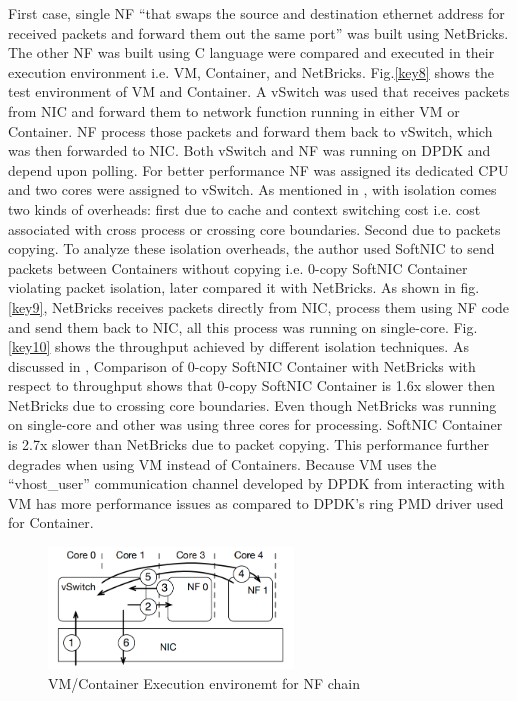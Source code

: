 \documentclass[10pt, a4paper, conference]{IEEEtran}
\begin{document}
First case, single NF “that swaps the source and destination ethernet address for received packets and forward them out the same port” \cite{Panda2016} was built using NetBricks. The other NF was built using C language were compared and executed in their execution environment i.e. VM, Container, and NetBricks. Fig.\ref{key8} shows the test environment of VM and Container. A vSwitch was used that receives packets from NIC and forward them to network function running in either VM or Container. NF process those packets and forward them back to vSwitch, which was then forwarded to NIC. Both vSwitch and NF was running on DPDK and depend upon polling\cite{Panda2016}. For better performance NF was assigned its dedicated CPU and two cores were assigned to vSwitch. As mentioned in \cite{Panda2016}, with isolation comes two kinds of overheads: first due to cache and context switching cost i.e. cost associated with cross process or crossing core boundaries. Second due to packets copying. To analyze these isolation overheads, the author used SoftNIC to send packets between Containers without copying i.e. 0-copy SoftNIC Container violating packet isolation, later compared it with NetBricks\cite{Panda2016}. As shown in fig.\ref{key9}, NetBricks receives packets directly from NIC, process them using NF code and send them back to NIC, all this process was running on single-core. Fig.\ref{key10} shows the throughput achieved by different isolation techniques. As discussed in \cite{Panda2016}, Comparison of 0-copy SoftNIC Container with NetBricks with respect to throughput shows that 0-copy SoftNIC Container is 1.6x slower then NetBricks due to crossing core boundaries. Even though NetBricks was running on single-core and other was using three cores for processing. SoftNIC Container is 2.7x slower than NetBricks due to packet copying. This performance further degrades when using VM instead of Containers. Because VM uses the “vhost\_user” communication channel developed by DPDK from interacting with VM has more performance issues as compared to DPDK’s ring PMD driver used for Container\cite{Panda2016}.
\begin{figure}
	\centering
	\includegraphics[width=65mm]{figures/fig9}
	\caption{VM/Container Execution environemt for NF chain\cite{Panda2016}}
	
	\label{key11}
\end{figure}
\end{document}
